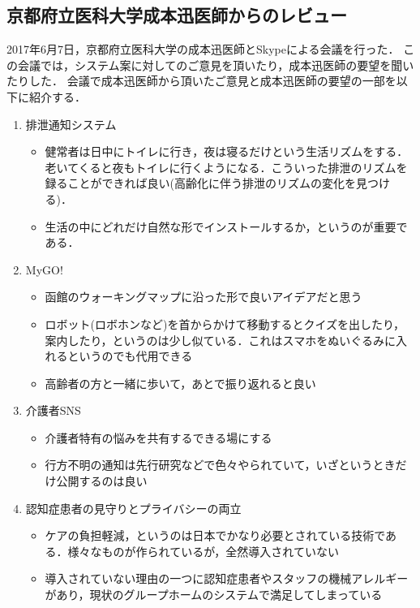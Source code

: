 \documentclass[../report]{subfiles}
\begin{document}
\subsection{京都府立医科大学成本迅医師からのレビュー}  \label{sec:4_hyouka_before3}
2017年6月7日，京都府立医科大学の成本迅医師とSkypeによる会議を行った．
この会議では，システム案に対してのご意見を頂いたり，成本迅医師の要望を聞いたりした．
会議で成本迅医師から頂いたご意見と成本迅医師の要望の一部を以下に紹介する．

\begin{enumerate}
    \item[] 排泄通知システム
\begin{itemize}
    \item 健常者は日中にトイレに行き，夜は寝るだけという生活リズムをする．
老いてくると夜もトイレに行くようになる．こういった排泄のリズムを録ることができれば良い(高齢化に伴う排泄のリズムの変化を見つける)．
    \item 生活の中にどれだけ自然な形でインストールするか，というのが重要である．
\end{itemize}

    \item[] MyGO!
\begin{itemize}
    \item 函館のウォーキングマップに沿った形で良いアイデアだと思う
    \item ロボット(ロボホンなど)を首からかけて移動するとクイズを出したり，案内したり，というのは少し似ている．これはスマホをぬいぐるみに入れるというのでも代用できる
    \item 高齢者の方と一緒に歩いて，あとで振り返れると良い
\end{itemize}

    \item[] 介護者SNS
\begin{itemize}
    \item 介護者特有の悩みを共有するできる場にする
    \item 行方不明の通知は先行研究などで色々やられていて，いざというときだけ公開するのは良い
\end{itemize}

    \item[] 認知症患者の見守りとプライバシーの両立
\begin{itemize}
    \item ケアの負担軽減，というのは日本でかなり必要とされている技術である．様々なものが作られているが，全然導入されていない
    \item 導入されていない理由の一つに認知症患者やスタッフの機械アレルギーがあり，現状のグループホームのシステムで満足してしまっている
\end{itemize}


\end{enumerate}
\end{document}
